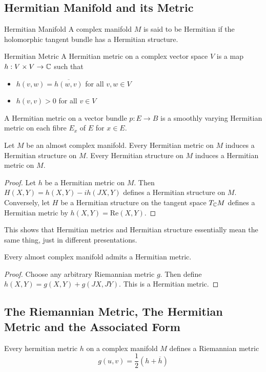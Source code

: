 \documentclass[a4paper]{article}
\begin{document}
\subsection{Hermitian Manifold and its Metric}
\begin{defn}{Hermitian Manifold}{} A complex manifold $M$ is said to be Hermitian if the holomorphic tangent bundle has a Hermitian structure. 
\end{defn}

\begin{defn}{Hermitian Metric}{} A Hermitian metric on a complex vector space $V$ is a map $h:V\times V\to\mathbb{C}$ such that 
\begin{itemize}
\item $h(v,w)=\overline{h(w,v)}$ for all $v,w\in V$
\item $h(v,v)>0$ for all $v\in V$
\end{itemize}
A Hermitian metric on a vector bundle $p:E\to B$ is a smoothly varying Hermitian metric on each fibre $E_x$ of $E$ for $x\in E$. 
\end{defn}

\begin{prp}{}{} Let $M$ be an almost complex manifold. Every Hermitian metric on $M$ induces a Hermitian structure on $M$. Every Hermitian structure on $M$ induces a Hermitian metric on $M$. \tcbline
\begin{proof}
Let $h$ be a Hermitian metric on $M$. Then $H(X,Y)=h(X,Y)-ih(JX,Y)$ defines a Hermitian structure on $M$. Conversely, let $H$ be a Hermitian structure on the tangent space $T_{\mathbb{C}} M$ defines a Hermitian metric by $h(X,Y)=\text{Re}(X,Y)$. 
\end{proof}
\end{prp}

This shows that Hermitian metrics and Hermitian structure essentially mean the same thing, just in different presentations. 

\begin{prp}{}{} Every almost complex manifold admits a Hermitian metric. \tcbline
\begin{proof}
Choose any arbitrary Riemannian metric $g$. Then define $h(X,Y)=g(X,Y)+g(JX,JY)$. This is a Hermitian metric. 
\end{proof}
\end{prp}

\subsection{The Riemannian Metric, The Hermitian Metric and the Associated Form}
\begin{prp}{}{} Every hermitian metric $h$ on a complex manifold $M$ defines a Riemannian metric $$g(u,v)=\frac{1}{2}(h+\overline{h})$$
\end{prp}
\end{document}
